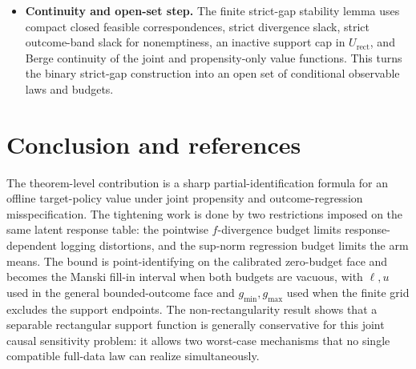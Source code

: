 \documentclass[11pt]{article}
\theoremstyle{definition}
\theoremstyle{plain}
\theoremstyle{remark}
\begin{document}
\begin{itemize}[leftmargin=*]
\item \textbf{Continuity and open-set step.}  The finite strict-gap stability
lemma uses compact closed feasible correspondences, strict divergence slack,
strict outcome-band slack for nonemptiness, an inactive support cap in
$U_{\mathrm{rect}}$, and Berge continuity of the joint and propensity-only
value functions.  This turns the binary strict-gap construction into an open
set of conditional observable laws and budgets.
\end{itemize}

\section{Conclusion and references}
The theorem-level contribution is a sharp partial-identification formula for an
offline target-policy value under joint propensity and outcome-regression
misspecification.  The tightening work is done by two restrictions imposed on
the same latent response table: the pointwise $f$-divergence budget limits
response-dependent logging distortions, and the sup-norm regression budget
limits the arm means.  The bound is point-identifying on the calibrated
zero-budget face and becomes the Manski fill-in interval when both budgets are
vacuous, with $\ell,u$ used in the general bounded-outcome face and
$g_{\min},g_{\max}$ used when the finite grid excludes the support endpoints.
The non-rectangularity result shows that a separable rectangular support
function is generally conservative for this joint causal sensitivity problem:
it allows two worst-case mechanisms that no single compatible full-data law can
realize simultaneously.
\end{document}
